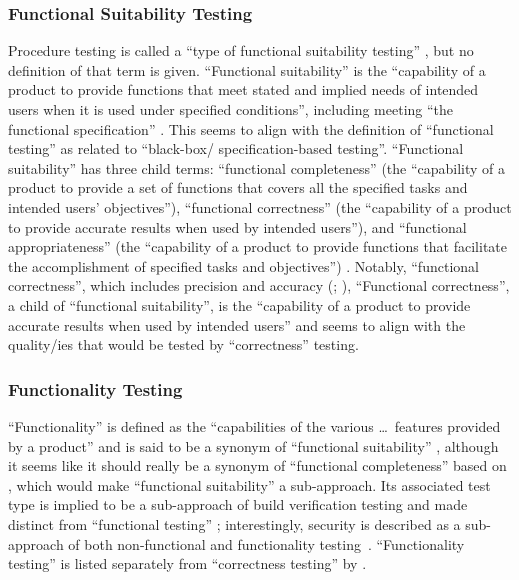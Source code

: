 
\subsubsection{Functional Suitability Testing}
Procedure testing is
called a ``type of functional suitability testing''
\citep[p.~7]{IEEE2022}, but no definition of that term is given.
``Functional suitability'' is the
``capability of a product to provide functions that meet stated and
implied needs of intended users when it is used under specified
conditions'', including meeting ``the functional specification''
\citep{ISO_IEC2023a}. This seems to align with the definition of
``functional testing'' as related to ``black-box/%
specification-based testing''.
\ifnotpaper
      ``Functional suitability'' has
      three child terms: ``functional completeness'' (the ``capability of
      a product to provide a set of functions that covers all the
      specified tasks and intended users' objectives''), ``functional
      correctness'' (the ``capability of a product to provide accurate
      results when used by intended users''), and ``functional
      appropriateness'' (the ``capability of a product to provide
      functions that facilitate the accomplishment of specified tasks and
      objectives'') \citep{ISO_IEC2023a}. Notably, ``functional
      correctness'', which includes precision and accuracy
      (\citealp{ISO_IEC2023a}; \citealpISTQB{}), \else ``Functional
      correctness'', a child of ``functional suitability'', is the ``capability
      of a product to provide accurate results when used by intended users''
      \cite{ISO_IEC2023a} and \fi seems to align with
the quality/ies that would be tested by ``correctness'' testing.

\subsubsection{Functionality Testing}
``Functionality'' is defined as the
``capabilities of the various \dots\ features provided by a product''
\citep[p.~196]{IEEE2017} and is said to be a synonym of
``functional suitability'' \citepISTQB{}, although it seems
like it should really be a synonym of ``functional completeness'' based on
\citep{ISO_IEC2023a}, which would make ``functional suitability'' a
sub-approach. Its associated test type
is implied to be a sub-approach of build verification testing
\citepISTQB{} and made distinct from ``functional testing''%
\ifnotpaper; interestingly, security is described as a sub-approach of both
non-functional and functionality testing\fi\ \citep[Tab.~2]{Gerrard2000a}.
``Functionality testing'' is listed separately from ``correctness testing'' by
\citet[p.~53]{Firesmith2015}.

